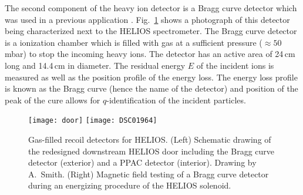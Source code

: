 The second component of the heavy ion detector is a Bragg curve detector which was used in a previous application \cite{Pearson_1995}.  Fig.~\ref{bragg} shows a photograph of this detector being characterized next to the HELIOS spectrometer.  The Bragg curve detector is a ionization chamber which is filled with gas at a sufficient pressure ($\approx 50$\,mbar) to stop the incoming heavy ions.  The detector has an active area of 24\,cm long and 14.4\,cm in diameter.  The residual energy $E$ of the incident ions is measured as well as the position profile of the energy loss.  The energy loss profile is known as the Bragg curve (hence the name of the detector) and position of the peak of the cure allows for $q$-identification of the incident particles.
\begin{figure}[hb]
\centering
\texttt{[image: door]}
\texttt{[image: DSC01964]}
\caption[Gas-filled recoil detectors for HELIOS]{Gas-filled recoil detectors for HELIOS.  (Left) Schematic drawing of the redesigned downstream HELIOS door including the Bragg curve detector (exterior) and a PPAC detector (interior).  Drawing by A.\ Smith. (Right) Magnetic field testing of a Bragg curve detector during an energizing procedure of the HELIOS solenoid.}%
\label{bragg}%
\end{figure}
